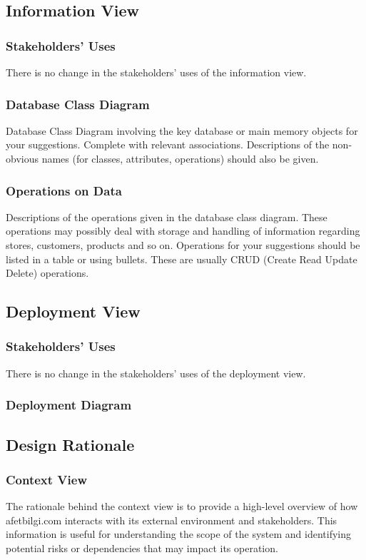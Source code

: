 \documentclass[a4paper]{article}
\begin{document}
    \subsection{Information View}
    \subsubsection{Stakeholders' Uses}
    There is no change in the stakeholders' uses of the information view.
    \subsubsection{Database Class Diagram}
    Database Class Diagram involving the key database or main memory objects for
    your suggestions. Complete with relevant associations. Descriptions of the non-
    obvious names (for classes, attributes, operations) should also be given.
    \subsubsection{Operations on Data}
    Descriptions of the operations given in the database class diagram. These
    operations may possibly deal with storage and handling of information regarding
    stores, customers, products and so on. Operations for your suggestions should be
    listed in a table or using bullets.
    These are usually CRUD (Create Read Update Delete) operations.
    \subsection{Deployment View}
    \subsubsection{Stakeholders' Uses}
    There is no change in the stakeholders' uses of the deployment view.
    \subsubsection{Deployment Diagram}
    \subsection{Design Rationale}
    \subsubsection{Context View}
    The rationale behind the context view is to provide a high-level overview of how afetbilgi.com interacts with its external
    environment and stakeholders. This information is useful for understanding the scope of the system and identifying potential
    risks or dependencies that may impact its operation.
\end{document}
